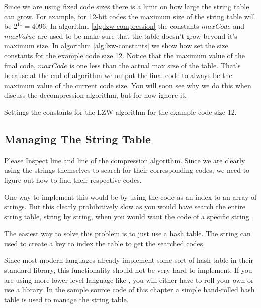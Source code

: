 \begin{refsection}
Since we are using fixed code sizes there is a limit on how large the
string table can grow. For example, for 12-bit codes the maximum size
of the string table will be $2^{11}=4096$. In algorithm
\ref{alg:lzw-compression} the constants $maxCode$ and $maxValue$ are
used to be make sure that the table doesn't grow beyond it's maximum
size. In algorithm \ref{alg:lzw-constants} we show how set the size
constants for the example code size 12. Notice that the maximum value
of the final code, $maxCode$ is one less than the actual max size of
the table. That's because at the end of algorithm we output the final
code to always be the maximum value of the current code size. You will
soon see why we do this when discuss the decompression algorithm, but for
now ignore it.

\begin{algorithm}[H]
  \caption{Settings the constants for the LZW algorithm for the
    example code size 12.}
  \label{alg:lzw-constants}
  \begin{algorithmic}[1]
  \end{algorithmic}
\end{algorithm}

\subsection{Managing The String Table}

Please Inspect line
 and line
 of the compression
algorithm. Since we are clearly using the strings themselves to search
for their corresponding codes, we need to figure out how to find their
respective codes.

One way to implement this would be by using the code as an index to an
array of strings. But this clearly prohibitively slow as you would
have search the entire string table, string by string, when you would
want the code of a specific string.

The easiest way to solve this problem is to just use a hash table. The
string can used to create a key to index the table to get the searched
codes.

Since most modern languages already implement some sort of hash table
in their standard library, this functionality should not be very hard
to implement. If you are using more lower level language like \C, you
will either have to roll your own or use a library. In the sample \C
source code of this chapter a simple hand-rolled hash table
is used to manage the string table.


\end{refsection}

